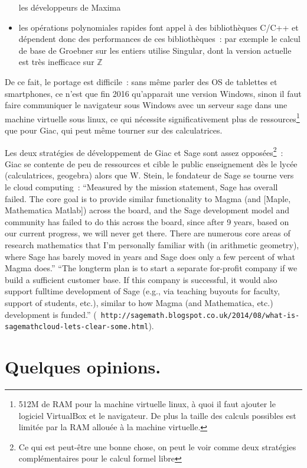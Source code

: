 \documentclass[a4paper,11pt]{book}
\begin{document}
\begin{giacjshere}
\begin{itemize}
les d\'eveloppeurs de Maxima
\item
les op\'erations polynomiales rapides font appel \`a des
biblioth\`eques C/C++ et d\'ependent donc des performances
de ces biblioth\`eques~: par exemple le calcul de base
de Groebner sur les entiers utilise Singular, dont la version
actuelle est tr\`es inefficace sur $\mathbb{Z}$
\end{itemize} 
De ce fait, le portage est difficile~: sans m\^eme parler des OS de tablettes
et smartphones, ce n'est que fin 2016 qu'apparait une version 
Windows, sinon il faut faire communiquer le navigateur sous Windows 
avec un serveur sage dans une machine virtuelle sous linux, ce qui n\'ecessite
significativement plus de ressources\footnote{512M de RAM pour la
machine virtuelle linux, \`a quoi il faut ajouter 
le logiciel VirtualBox et le navigateur. De plus la taille des
calculs possibles est limit\'ee par la RAM allou\'ee \`a
la machine virtuelle.} que pour Giac, 
qui peut m\^eme tourner sur des calculatrices.

Les deux strat\'egies de d\'eveloppement de Giac et Sage
sont assez oppos\'ees\footnote{Ce qui est peut-\^etre une bonne chose,
on peut le voir comme deux strat\'egies compl\'ementaires pour le
calcul formel libre}~: Giac se contente de peu de ressources et cible le 
public enseignement d\`es le lyc\'ee (calculatrices, geogebra) alors
que W. Stein, le fondateur de Sage se tourne vers le cloud computing~:
``Measured by the mission statement, Sage has overall failed. The core
goal is to provide similar functionality to Magma (and [Maple,
Mathematica Matlab]) across the board, and the Sage development model
and community has failed to do this across the board, since after 9
years, based on our current progress, we will never get there. There
are numerous core areas of research mathematics that I'm personally
familiar with (in arithmetic geometry), where Sage has barely moved in
years and Sage does only a few percent of what Magma does.''
``The longterm plan is to start a separate for-profit company if we
build a sufficient customer base. If this company is successful, it
would also support fulltime development of Sage (e.g., via teaching
buyouts for faculty, support of students, etc.), similar to how Magma
(and Mathematica, etc.) development is funded.'' ({\tt \tiny
  http://sagemath.blogspot.co.uk/2014/08/what-is-sagemathcloud-lets-clear-some.html}).

\chapter{Quelques opinions.}

\end{giacjshere}
\end{document}
